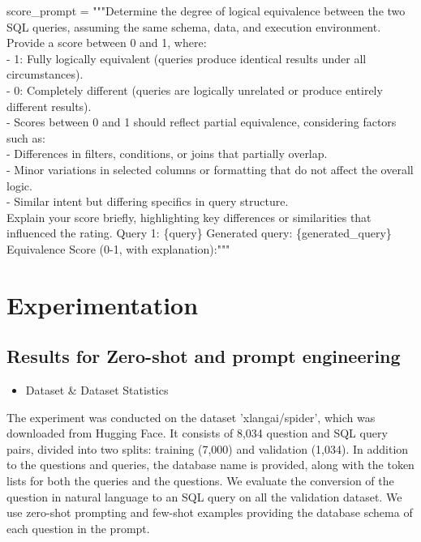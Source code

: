 \documentclass[12pt,a4paper]{article}
\begin{document}
score\_prompt = """Determine the degree of logical equivalence between the two SQL queries, assuming the same schema, data, and execution environment. Provide a score between 0 and 1, where:
\\
- 1: Fully logically equivalent (queries produce identical results under all circumstances).
\\
- 0: Completely different (queries are logically unrelated or produce entirely different results).
\\
- Scores between 0 and 1 should reflect partial equivalence, considering factors such as:
\\
- Differences in filters, conditions, or joins that partially overlap.
\\
- Minor variations in selected columns or formatting that do not affect the overall logic.
\\
- Similar intent but differing specifics in query structure.
\\
Explain your score briefly, highlighting key differences or similarities that influenced the rating.
Query 1:
\{query\}
Generated query:
\{generated\_query\}
Equivalence Score (0-1, with explanation):"""






\section*{Experimentation}
\subsection*{Results for Zero-shot and prompt engineering}

\begin{itemize}
  \item Dataset \& Dataset Statistics
  \end{itemize}
  The experiment was conducted on the dataset 'xlangai/spider', which was downloaded from Hugging Face. It consists of 8,034 question and SQL query pairs, divided into two splits: training (7,000) and validation (1,034). In addition to the questions and queries, the database name is provided, along with the token lists for both the queries and the questions. We evaluate the conversion of the question in natural language to an SQL query on all the validation dataset. We use zero-shot prompting and few-shot examples providing the database schema of each question in the prompt.
  
\end{document}
